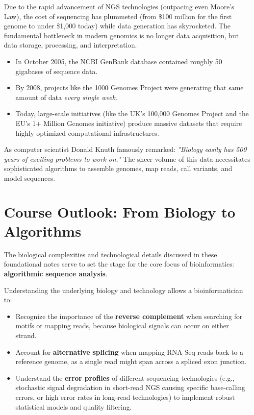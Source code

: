 Due to the rapid advancement of NGS technologies (outpacing even Moore's Law), the cost of sequencing has plummeted (from \$100 million for the first genome to under \$1,000 today) while data generation has skyrocketed. The fundamental bottleneck in modern genomics is no longer data acquisition, but data storage, processing, and interpretation.


\begin{itemize}
  \item In October 2005, the NCBI GenBank database contained roughly 50 gigabases of sequence data.
  \item By 2008, projects like the 1000 Genomes Project were generating that same amount of data \textit{every single week}.
  \item Today, large-scale initiatives (like the UK's 100,000 Genomes Project and the EU's 1+ Million Genomes initiative) produce massive datasets that require highly optimized computational infrastructures.
\end{itemize}

As computer scientist Donald Knuth famously remarked: \textit{"Biology easily has 500 years of exciting problems to work on."} The sheer volume of this data necessitates sophisticated algorithms to assemble genomes, map reads, call variants, and model sequences.

\section{Course Outlook: From Biology to Algorithms}

The biological complexities and technological details discussed in these foundational notes serve to set the stage for the core focus of bioinformatics: \textbf{algorithmic sequence analysis}.

Understanding the underlying biology and technology allows a bioinformatician to:
\begin{itemize}
  \item Recognize the importance of the \textbf{reverse complement} when searching for motifs or mapping reads, because biological signals can occur on either strand.
  \item Account for \textbf{alternative splicing} when mapping RNA-Seq reads back to a reference genome, as a single read might span across a spliced exon junction.
  \item Understand the \textbf{error profiles} of different sequencing technologies (e.g., stochastic signal degradation in short-read NGS causing specific base-calling errors, or high error rates in long-read technologies) to implement robust statistical models and quality filtering.
\end{itemize}

